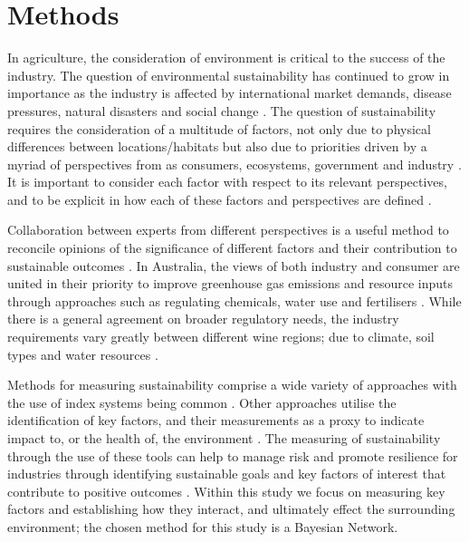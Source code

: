 \section{Methods}

In agriculture, the consideration of environment is critical to the success of the industry. The question of environmental sustainability has continued to grow in importance as the industry is affected by international market demands, disease pressures, natural disasters and social change \citep{wineaustraliaNationalVintageReport2022,wineaustraliaNationalVintageReport2020,wineaustraliaNationalVintageReport2021,cassonMultidisciplinaryApproachAssess2022}. The question of sustainability requires the consideration of a multitude of factors, not only due to physical differences between locations/habitats but also due to priorities driven by a myriad of perspectives from as consumers, ecosystems, government and industry \citep{baianoOverviewSustainabilityWine2021,wayeCarbonFootprintsFood2008}. It is important to consider each factor with respect to its relevant perspectives, and to be explicit in how each of these factors and perspectives are defined \citep{santiago-brownSustainabilityAssessmentWineGrape2015}.

Collaboration between experts from different perspectives is a useful method to reconcile opinions of the significance of different factors and their contribution to sustainable outcomes \citep{dichiaraCollaborativeApproachAchieving2024}. In Australia, the views of both industry and consumer are united in their priority to improve greenhouse gas emissions and resource inputs through approaches such as regulating chemicals, water use and fertilisers \citep{dumbrellComparingAustralianPublic2024}. While there is a general agreement on broader regulatory needs, the industry requirements vary greatly between different wine regions; due to climate, soil types and water resources \citep{abbalDecisionSupportSystem2016,agostaRegionalClimateVariability2012}.

Methods for measuring sustainability comprise a wide variety of approaches with the use of index systems being common \citep{gehringerMappingSustainabilityMeasurement2024}. Other approaches utilise the identification of key factors, and their measurements as a proxy to indicate impact to, or the health of, the environment \citep{floresWhatSustainabilityWine2018}. The measuring of sustainability through the use of these tools can help to manage risk and promote resilience for industries through identifying sustainable goals and key factors of interest that contribute to positive outcomes \citep{klemesAssessingMeasuringEnvironmental2015, beckerSustainabilityScienceManaging2024}. Within this study we focus on measuring key factors and establishing how they interact, and ultimately effect the surrounding environment; the chosen method for this study is a Bayesian Network.

